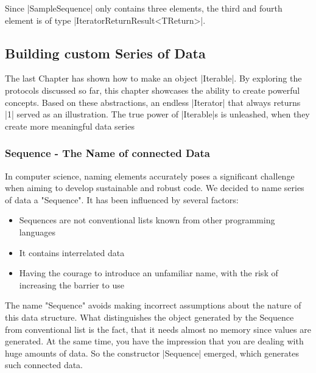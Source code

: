 Since |SampleSequence| only contains three elements, the third
and fourth element is of type |IteratorReturnResult<TReturn>|.

\subsection{Building custom Series of Data}
\label{sub:Building custom Series of Data}
The last Chapter has shown how to make an object |Iterable|. By exploring the 
protocols discussed so far, this chapter showcases the ability to create 
powerful concepts. Based on these abstractions, an endless |Iterator| that always
returns |1| served as an illustration. The true power of |Iterable|s is 
unleashed, when they create more meaningful data series
\subsubsection{Sequence - The Name of connected Data}
\label{subsub:Sequence - The Name of connected Data}
In computer science, naming elements accurately poses a significant challenge 
when aiming to develop sustainable and robust code. We decided to name series
of data a "Sequence". It has been influenced by several factors:

\begin{itemize}
  \item{Sequences are not conventional lists known from other programming languages}
  \item{It contains interrelated data}
  \item{Having the courage to introduce an unfamiliar name, with the risk of increasing the barrier to use}
\end{itemize}

The name "Sequence" avoids making incorrect assumptions about the nature of
this data structure.
\newline
What distinguishes the object generated by the Sequence from conventional list
is the fact, that it needs almost no memory since values are generated. At the 
same time, you have the impression that you are dealing with huge amounts of data.
So the constructor |Sequence| emerged, which generates such connected data.

